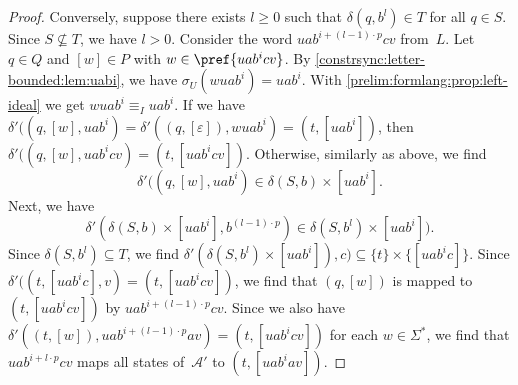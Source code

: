 \begin{proof}
	Conversely, suppose there exists $l \ge 0$ such that $\delta(q, b^l) \in T$
	for all $q \in S$. Since $S \not\subseteq T$, we have $l > 0$.
	Consider the word $u a b^{i + (l-1)\cdot p} c v$ from~$L$.
	Let $q \in Q$ and $[w] \in P$ with $w \in \pref{uab^icv}$.
	By \cref{constrsync:letter-bounded:lem:uabi},
	we have $\sigma_U(wuab^i) = uab^i$.
	With \cref{prelim:formlang:prop:left-ideal} 
	we get $wuab^i \equiv_I uab^i$.
	If we have
	$\delta'((q, [w], uab^i) = \delta'((q, [\varepsilon]), wuab^i) = (t, [uab^i])$,
	then $\delta'((q, [w], uab^icv) = (t, [uab^icv])$.
	Otherwise, similarly as above, we find
	\[
	\delta'((q, [w], uab^i) \in \delta(S, b) \times [uab^i].
	\]
	Next, we have	
	\[ 
	\delta'(\delta(S, b) \times [uab^i], b^{(l-1)\cdot p}) \in \delta(S, b^l) \times [uab^i]).
	\]
	Since $\delta(S, b^l) \subseteq T$,
	we find $\delta'( \delta(S, b^l) \times [uab^i]), c) \subseteq \{t\} \times \{[uab^ic]\}$.
	Since $\delta'((t, [uab^ic], v) = (t, [uab^icv])$,
	we find that $(q, [w])$ is mapped to $(t, [uab^icv])$
	by $u a b^{i + (l-1)\cdot p} c v$.
	Since we also have $\delta'((t, [w]), u a b^{i + (l-1)\cdot p} a v) = (t, [uab^icv])$
	for each $w \in \Sigma^*$,
	we find that $u a b^{i + l\cdot p} c v$
	maps all states of~$\mathcal A'$
	to $(t, [uab^iav])$.
\end{proof}